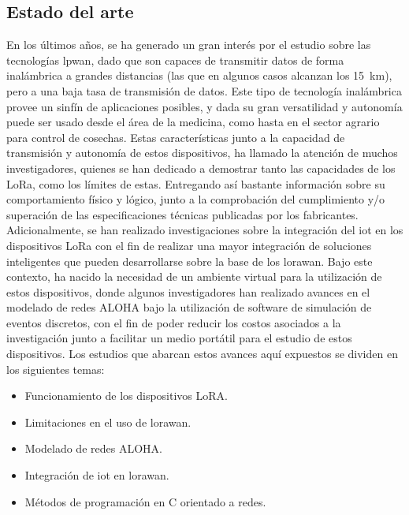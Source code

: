 \begin{justify}
\chapter[Estado del arte]{Estado del arte}
\label{ch:estadodelarte}

En los últimos años, se ha generado un gran interés por el estudio sobre las tecnologías \gls{lpwan}, dado que son capaces de transmitir datos de forma inalámbrica a grandes distancias (las que en algunos casos alcanzan los \SI{15}{\kilo\meter}), pero a una baja tasa de transmisión de datos. Este tipo de tecnología inalámbrica provee un sinfín de aplicaciones posibles, y dada su gran versatilidad y autonomía puede ser usado desde el área de la medicina, como hasta en el sector agrario para control de cosechas. Estas características junto a la capacidad de transmisión y autonomía de estos dispositivos, ha llamado la atención de muchos investigadores, quienes se han dedicado a demostrar tanto las capacidades de los LoRa, como los límites de estas. Entregando así bastante información sobre su comportamiento físico y lógico, junto a la comprobación del cumplimiento y/o superación de las especificaciones técnicas publicadas por los fabricantes. Adicionalmente, se han realizado investigaciones sobre la integración del \gls{iot} en los dispositivos LoRa con el fin de realizar una mayor integración de soluciones inteligentes que pueden desarrollarse sobre la base de los \gls{lorawan}. Bajo este contexto, ha nacido la necesidad de un ambiente virtual para la utilización de estos dispositivos, donde algunos investigadores han realizado avances en el modelado de redes ALOHA bajo la utilización de software de simulación de eventos discretos, con el fin de poder reducir los costos asociados a la investigación junto a facilitar un medio portátil  para el estudio de estos dispositivos.\newpage \noindent
Los estudios que abarcan estos avances aquí expuestos se dividen en los siguientes temas:
\begin{itemize}
\item Funcionamiento de los dispositivos LoRA.\\
\item Limitaciones en el uso de \gls{lorawan}.\\
\item Modelado de redes ALOHA.\\
\item Integración de \gls{iot} en \gls{lorawan}.\\
\item Métodos de programación en C orientado a redes.\\
\end{itemize} 


\end{justify}
